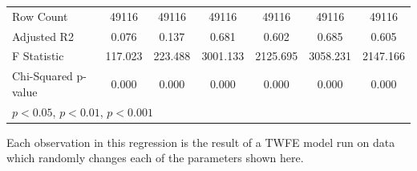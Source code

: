 \documentclass[12pt]{article}
\begin{document}
\begin{table}[htbp]
{\begin{tabular}{p{4.5in}|*{6}{c}}
\hline
Row Count           &   49116         &   49116         &   49116         &   49116         &   49116         &   49116         \\
Adjusted R2         &       0.076         &       0.137         &       0.681         &       0.602         &       0.685         &       0.605         \\
F Statistic         &     117.023         &     223.488         &    3001.133         &    2125.695         &    3058.231         &    2147.166         \\
Chi-Squared p-value &       0.000         &       0.000         &       0.000         &       0.000         &       0.000         &       0.000         \\
\hline\hline
\multicolumn{7}{l}{\footnotesize \sym{*} \(p<0.05\), \sym{**} \(p<0.01\), \sym{***} \(p<0.001\)}\\
\end{tabular}
}
\footnotesize  
\vspace{5mm}
    \footnotesize \begin{singlespace*}
        Each observation in this regression is the result of a TWFE model run on data which randomly changes each of the parameters shown here.
    \end{singlespace*}
\end{table}
\end{document}
